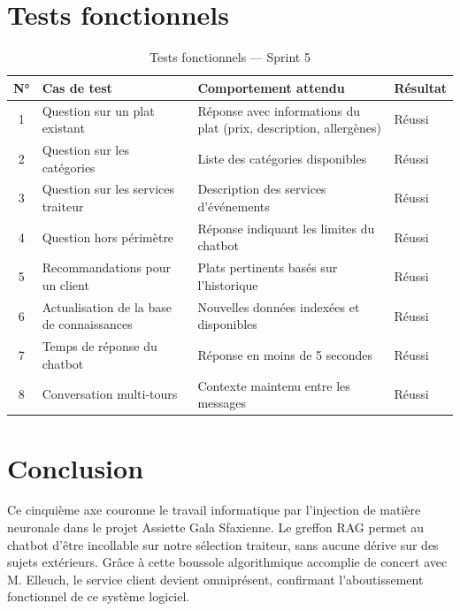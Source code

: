 \section{Tests fonctionnels}

\begin{table}[H]
    \centering
    \caption{Tests fonctionnels --- Sprint 5}
    \label{tab:tests_sprint5}
    \renewcommand{\arraystretch}{1.3}
    \begin{tabular}{|c|p{3cm}|p{3.5cm}|p{2.5cm}|}
        \hline
        \textbf{N°} & \textbf{Cas de test} & \textbf{Comportement attendu} & \textbf{Résultat} \\
        \hline
        1 & Question sur un plat existant & Réponse avec informations du plat (prix, description, allergènes) & Réussi \\
        \hline
        2 & Question sur les catégories & Liste des catégories disponibles & Réussi \\
        \hline
        3 & Question sur les services traiteur & Description des services d'événements & Réussi \\
        \hline
        4 & Question hors périmètre & Réponse indiquant les limites du chatbot & Réussi \\
        \hline
        5 & Recommandations pour un client & Plats pertinents basés sur l'historique & Réussi \\
        \hline
        6 & Actualisation de la base de connaissances & Nouvelles données indexées et disponibles & Réussi \\
        \hline
        7 & Temps de réponse du chatbot & Réponse en moins de 5 secondes & Réussi \\
        \hline
        8 & Conversation multi-tours & Contexte maintenu entre les messages & Réussi \\
        \hline
    \end{tabular}
\end{table}

\section{Conclusion}

Ce cinquième axe couronne le travail informatique par l'injection de matière neuronale dans le projet Assiette Gala Sfaxienne. Le greffon RAG permet au chatbot d'être incollable sur notre sélection traiteur, sans aucune dérive sur des sujets extérieurs. Grâce à cette boussole algorithmique accomplie de concert avec M. Elleuch, le service client devient omniprésent, confirmant l'aboutissement fonctionnel de ce système logiciel.

